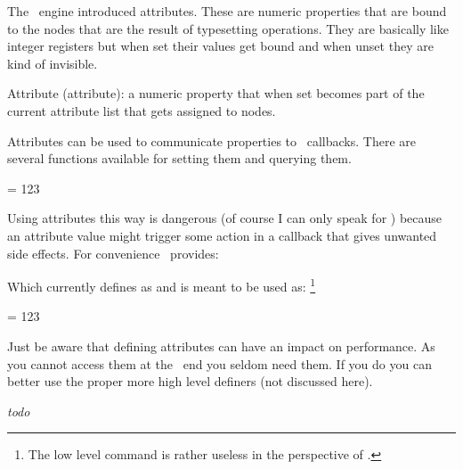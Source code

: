 \stopsectionlevel

\startsectionlevel[title={\LUATEX\ primitives}]

The \LUATEX\ engine introduced attributes. These are numeric properties that are
bound to the nodes that are the result of typesetting operations. They are
basically like integer registers but when set their values get bound and when
unset they are kind of invisible.

\startitemize
\startitem
    Attribute (attribute): a numeric property that when set becomes part of the
    current attribute list that gets assigned to nodes.
\stopitem
\stopitemize

Attributes can be used to communicate properties to \LUA\ callbacks. There are
several functions available for setting them and querying them.

\starttyping[option=TEX]
 = 123
\stoptyping

Using attributes this way is dangerous (of course I can only speak for \CONTEXT)
because an attribute value might trigger some action in a callback that gives
unwanted side effects. For convenience \CONTEXT\ provides:

\startbuffer
\newattribute\MyAttribute
\stopbuffer

\typebuffer[option=TEX] \getbuffer

Which currently defines \type {\MyAttribute} as {\tt \meaning\MyAttribute} and is
meant to be used as: \footnote {The low level \type {\attributedef} command is
rather useless in the perspective of \CONTEXT.}

\starttyping[option=TEX]
\attribute\MyAttribute = 123
\stoptyping

Just be aware that defining attributes can have an impact on performance. As you
cannot access them at the \TEX\ end you seldom need them. If you do you can
better use the proper more high level definers (not discussed here).

\stopsectionlevel

\startsectionlevel[title={\LUAMETATEX\ primitives}]

{\em todo}

\stopsectionlevel

\stopdocument

